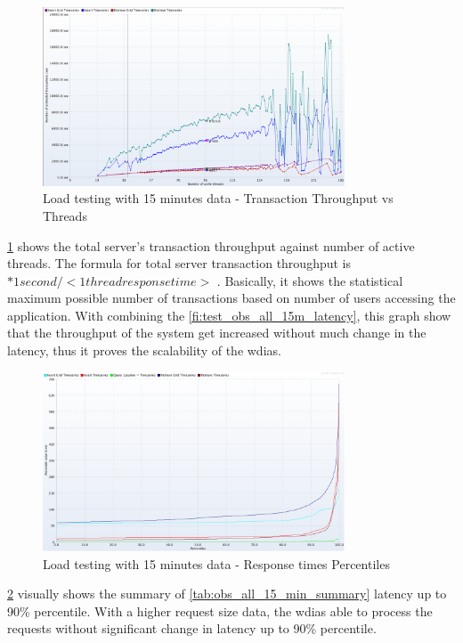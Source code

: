 \begin{figure}[htp]
    \centering
    \includegraphics[width=0.8\textwidth]{results/obs/all/obs_all_15m_transaction_throughtput_vs_threads.png}
    \caption{Load testing with 15 minutes data - Transaction Throughput vs Threads}
    \label{fi:test_obs_all_15m_throughtput}
\end{figure}
\ref{fi:test_obs_all_15m_throughtput} shows the total server's transaction throughput against number of active threads.
The formula for total server transaction throughput is \(<active threads> * 1 second / <1  thread response time>\) \cite{JMeterPluginsTransactionPlugin}. Basically, it shows the statistical maximum possible number of transactions based on number of users accessing the application.
With combining the \ref{fi:test_obs_all_15m_latency}, this graph show that the throughput of the system get increased without much change in the latency, thus it proves the scalability of the \acrshort{wdias}.

\begin{figure}[htp]
    \centering
    \includegraphics[width=0.8\textwidth]{results/obs/all/obs_all_15m_response_times_percentiles.png}
    \caption{Load testing with 15 minutes data - Response times Percentiles}
    \label{fi:test_obs_all_15m_latency_percentile}
\end{figure}
\ref{fi:test_obs_all_15m_latency_percentile} visually shows the summary of \ref{tab:obs_all_15_min_summary} latency up to 90\% percentile. With a higher request size data, the \acrshort{wdias} able to process the requests without significant change in latency up to 90\% percentile.


